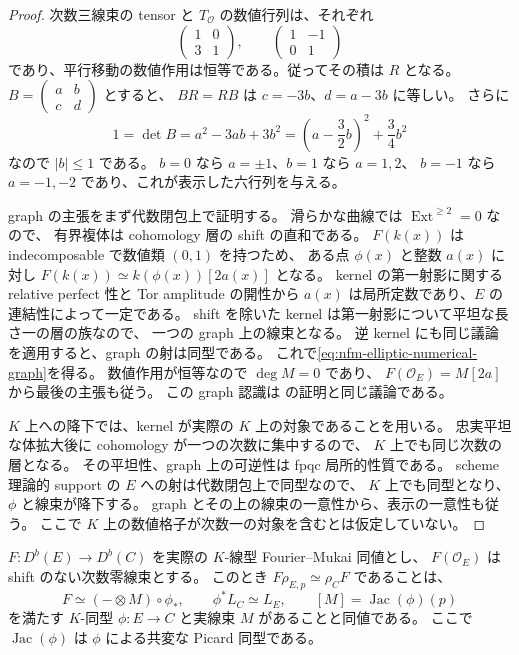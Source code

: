 \begin{proof}
次数三線束の tensor と $T_{\mathcal O}$ の数値行列は、それぞれ
\[
 \begin{pmatrix}1&0\\3&1\end{pmatrix},\qquad
 \begin{pmatrix}1&-1\\0&1\end{pmatrix}
\]
であり、平行移動の数値作用は恒等である。従ってその積は $R$ となる。
$B=\left(\begin{smallmatrix}a&b\\c&d\end{smallmatrix}\right)$ とすると、
$BR=RB$ は $c=-3b$、$d=a-3b$ に等しい。
さらに
\[
 1=\det B=a^2-3ab+3b^2
   =\left(a-\frac32b\right)^2+\frac34b^2
\]
なので $|b|\le1$ である。
$b=0$ なら $a=\pm1$、$b=1$ なら $a=1,2$、
$b=-1$ なら $a=-1,-2$ であり、これが表示した六行列を与える。

graph の主張をまず代数閉包上で証明する。
滑らかな曲線では $\operatorname{Ext}^{\ge2}=0$ なので、
有界複体は cohomology 層の shift の直和である。
$F(k(x))$ は indecomposable で数値類 $(0,1)$ を持つため、
ある点 $\phi(x)$ と整数 $a(x)$ に対し
$F(k(x))\simeq k(\phi(x))[2a(x)]$ となる。
kernel の第一射影に関する relative perfect 性と Tor amplitude の開性から
$a(x)$ は局所定数であり、$E$ の連結性によって一定である。
shift を除いた kernel は第一射影について平坦な長さ一の層の族なので、
一つの graph 上の線束となる。
逆 kernel にも同じ議論を適用すると、graph の射は同型である。
これで\eqref{eq:nfm-elliptic-numerical-graph}を得る。
数値作用が恒等なので $\deg M=0$ であり、
$F(\mathcal O_E)=M[2a]$ から最後の主張も従う。
この graph 認識は
\cite[Proposition~4.2, Corollary~4.3 and Theorem~5.3]{NFMHilleVdBFM}
の証明と同じ議論である。

$K$ 上への降下では、kernel が実際の $K$ 上の対象であることを用いる。
忠実平坦な体拡大後に cohomology が一つの次数に集中するので、
$K$ 上でも同じ次数の層となる。
その平坦性、graph 上の可逆性は fpqc 局所的性質である。
scheme 理論的 support の $E$ への射は代数閉包上で同型なので、
$K$ 上でも同型となり、$\phi$ と線束が降下する。
graph とその上の線束の一意性から、表示の一意性も従う。
ここで $K$ 上の数値格子が次数一の対象を含むとは仮定していない。
\end{proof}

\begin{theorem}
\label{thm:nfm-elliptic-normalized-intertwiners}
$F:D^b(E)\to D^b(C)$ を実際の $K$-線型 Fourier--Mukai 同値とし、
$F(\mathcal O_E)$ は shift のない次数零線束とする。
このとき $F\rho_{E,p}\simeq\rho_CF$ であることは、
\begin{equation}\label{eq:nfm-elliptic-normalized-intertwiners}
 F\simeq(-\otimes M)\circ\phi_*,\qquad
 \phi^*L_C\simeq L_E,\qquad
 [M]=\operatorname{Jac}(\phi)(p)
\end{equation}
を満たす $K$-同型 $\phi:E\to C$ と実線束 $M$ があることと同値である。
ここで $\operatorname{Jac}(\phi)$ は $\phi$ による共変な Picard 同型である。
\end{theorem}

